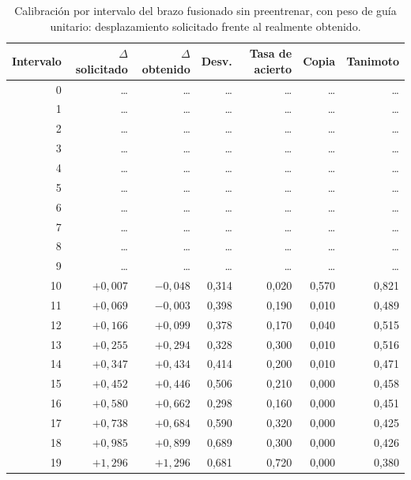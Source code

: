 %
\begin{table}[htbp]
  \centering
  \caption{Calibración por intervalo del brazo fusionado sin preentrenar, con
           peso de guía unitario: desplazamiento solicitado frente al
           realmente obtenido.}
  \label{tab:c2-calibracion}
  \setlength{\tabcolsep}{5pt}
  \footnotesize
  \begin{tabular}{@{}rrrrrrr@{}}
    \toprule
    Intervalo & $\Delta$ solicitado & $\Delta$ obtenido & Desv. & Tasa de acierto & Copia & Tanimoto \\
    \midrule
    0  & \dots & \dots & \dots & \dots & \dots & \dots \\
    1  & \dots & \dots & \dots & \dots & \dots & \dots \\
    2  & \dots & \dots & \dots & \dots & \dots & \dots \\
    3  & \dots & \dots & \dots & \dots & \dots & \dots \\
    4  & \dots & \dots & \dots & \dots & \dots & \dots \\
    5  & \dots & \dots & \dots & \dots & \dots & \dots \\
    6  & \dots & \dots & \dots & \dots & \dots & \dots \\
    7  & \dots & \dots & \dots & \dots & \dots & \dots \\
    8  & \dots & \dots & \dots & \dots & \dots & \dots \\
    9  & \dots & \dots & \dots & \dots & \dots & \dots \\
    10 & $+0{,}007$ & $-0{,}048$ & 0,314 & 0,020 & 0,570 & 0,821 \\
    11 & $+0{,}069$ & $-0{,}003$ & 0,398 & 0,190 & 0,010 & 0,489 \\
    12 & $+0{,}166$ & $+0{,}099$ & 0,378 & 0,170 & 0,040 & 0,515 \\
    13 & $+0{,}255$ & $+0{,}294$ & 0,328 & 0,300 & 0,010 & 0,516 \\
    14 & $+0{,}347$ & $+0{,}434$ & 0,414 & 0,200 & 0,010 & 0,471 \\
    15 & $+0{,}452$ & $+0{,}446$ & 0,506 & 0,210 & 0,000 & 0,458 \\
    16 & $+0{,}580$ & $+0{,}662$ & 0,298 & 0,160 & 0,000 & 0,451 \\
    17 & $+0{,}738$ & $+0{,}684$ & 0,590 & 0,320 & 0,000 & 0,425 \\
    18 & $+0{,}985$ & $+0{,}899$ & 0,689 & 0,300 & 0,000 & 0,426 \\
    19 & $+1{,}296$ & $+1{,}296$ & 0,681 & 0,720 & 0,000 & 0,380 \\
    \bottomrule
  \end{tabular}


\end{table}

